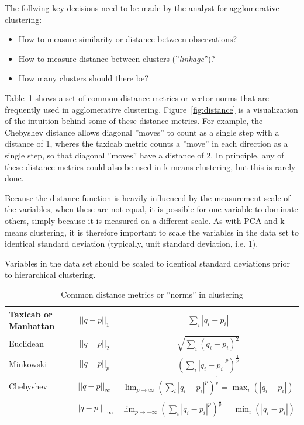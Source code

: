 The follwing key decisions need to be made by the analyst for agglomerative clustering:

\begin{itemize}
   \item How to measure similarity or distance between observations?
   \item How to measure distance between clusters (''\emph{linkage}'')?
   \item How many clusters should there be?
\end{itemize}

Table~\ref{tab:distance} shows a set of common distance metrics or vector norms that are frequently used in agglomerative clustering. Figure~\ref{fig:distance} is a visualization of the intuition behind some of these distance metrics. For example, the Chebyshev distance allows diagonal ''moves'' to count as a single step with a distance of 1, wheres the taxicab metric counts a ''move'' in each direction as a single step, so that diagonal ''moves'' have a distance of 2. In principle, any of these distance metrics could also be used in k-means clustering, but this is rarely done.

Because the distance function is heavily influenced by the measurement scale of the variables, when these are not equal, it is possible for one variable to dominate others, simply because it is measured on a different scale. As with PCA and k-means clustering, it is therefore important to scale the variables in the data set to identical standard deviation (typically, unit standard deviation, i.e. 1). 

\begin{tcolorbox}[colback=alert]
Variables in the data set should be scaled to identical standard deviations prior to hierarchical clustering.
\end{tcolorbox}


\begin{table}
\renewcommand{\arraystretch}{2}
\centering 
\begin{tabular}{l|c|c} \hline
\begin{minipage}{1.75cm}Taxicab or Manhattan\end{minipage} & $ ||q-p||_1 $ & $\displaystyle \sum_i | q_i - p_i |$ \\ \hline
Euclidean & $ ||q-p||_2$ & $\displaystyle \sqrt{ \sum_i (q_i-p_i)^2}$ \\ \hline
Minkowski & $||q-p||_p$ & $\displaystyle \left( \sum_i | q_i - p_i |^p \right)^{\frac{1}{p}}$ \\ \hline
Chebyshev & $||q-p||_\infty$ & $\displaystyle \lim_{p \rightarrow \infty} \left( \sum_i | q_i - p_i |^p \right)^{\frac{1}{p}} = \max_i( | q_i - p_i | )$ \\ \hline
  & $||q-p||_{-\infty}$ & $\displaystyle \lim_{p \rightarrow -\infty} \left( \sum_i | q_i - p_i |^p \right)^{\frac{1}{p}} = \min_i( | q_i - p_i | )$ \\ \hline
\end{tabular}
\caption{Common distance metrics or ''norms'' in clustering}
\label{tab:distance}
\end{table}

